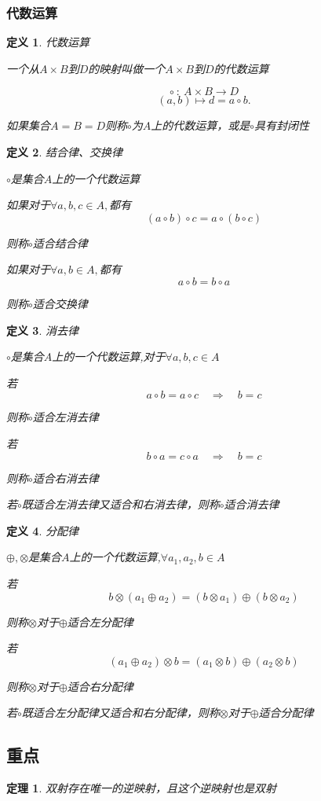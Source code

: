 \documentclass[a4paper]{ctexart}
\newtheorem{theorem}{定理}[section]
\newtheorem{definition}{定义}[subsection]
\begin{document}
		\subsubsection{代数运算}
	\begin{definition}
	代数运算
	
	一个从$A\times B$到$D$的映射叫做一个$A\times B$到$D$的代数运算
	
	\[\circ {\ :\ }A\times B \to D \]
	\[(a,b) \mapsto d = a\circ b. \]
	
	如果集合$A=B=D$则称$\circ$为$A$上的代数运算，或是$\circ$具有封闭性
	\end{definition}	
	\begin{definition}结合律、交换律
		
		$\circ$是集合$A$上的一个代数运算
		
		\item[(1)] 如果对于$\forall a,b,c\in A ,$都有\[(a\circ b)\circ c = a \circ (b\circ c)\]
		
		则称$\circ$适合结合律
		\item[(2)] 如果对于$\forall a,b\in A ,$都有\[a\circ b = b\circ a\]
		
		则称$\circ$适合交换律
	\end{definition}
	\begin{definition}
		消去律
		
		$\circ$是集合$A$上的一个代数运算,对于$\forall a,b,c\in A$
		
		\item[(1)] 若\[a\circ b = a \circ c \quad \Rightarrow \quad b=c\] 
		
		则称$\circ$适合左消去律
		\item[(2)]若\[b\circ a = c \circ a \quad \Rightarrow \quad b=c\]
		
		则称$\circ$适合右消去律
		\item[(3)]若$\circ$既适合左消去律又适合和右消去律，则称$\circ$适合消去律
	\end{definition}
	\begin{definition}
		分配律
		
		$\oplus,\otimes$是集合$A$上的一个代数运算,$\forall a_1,a_2,b\in A$
		
		\item[(1)] 若\[b\otimes(a_1\oplus a_2)  = (b\otimes a_1) \oplus (b\otimes a_2)\] 
		
		则称$\otimes$对于$ \oplus $适合左分配律
		\item[(2)]若\[(a_1\oplus a_2)\otimes b = (a_1\otimes b) \oplus (a_2\otimes b)\]
		
		则称$\otimes$对于$ \oplus $适合右分配律
		\item[(3)]若$\circ$既适合左分配律又适合和右分配律，则称$\otimes$对于$ \oplus $适合分配律
		
	\end{definition}

	
	
	\subsection{重点}
	\begin{theorem}
		双射存在唯一的逆映射，且这个逆映射也是双射
	\end{theorem}
	
\end{document}
